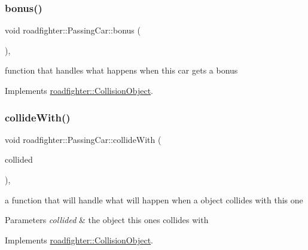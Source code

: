 \subsubsection{\texorpdfstring{bonus()}{bonus()}}
{\footnotesize\ttfamily void roadfighter\+::\+Passing\+Car\+::bonus (\begin{DoxyParamCaption}{ }\end{DoxyParamCaption})\hspace{0.3cm}{\ttfamily [override]}, {\ttfamily [virtual]}}

function that handles what happens when this car gets a bonus 

Implements \hyperlink{classroadfighter_1_1CollisionObject_a157e499c27619ceefd6179a459fafd90}{roadfighter\+::\+Collision\+Object}.

\mbox{\label{classroadfighter_1_1PassingCar_a04ee71b75c90f21efef591756855bf37}} 
\subsubsection{\texorpdfstring{collide\+With()}{collideWith()}}
{\footnotesize\ttfamily void roadfighter\+::\+Passing\+Car\+::collide\+With (\begin{DoxyParamCaption}\item[{std\+::shared\+\_\+ptr$<$ \hyperlink{classroadfighter_1_1CollisionObject}{Collision\+Object} $>$ \&}]{collided }\end{DoxyParamCaption})\hspace{0.3cm}{\ttfamily [override]}, {\ttfamily [virtual]}}

a function that will handle what will happen when a object collides with this one 
\begin{DoxyParams}{Parameters}
{\em collided} & the object this ones collides with \\
\hline
\end{DoxyParams}


Implements \hyperlink{classroadfighter_1_1CollisionObject_a7eafa2fdc4463788b816fdd9370d28d9}{roadfighter\+::\+Collision\+Object}.

\mbox{\label{classroadfighter_1_1PassingCar_a5c437fb5164d2735881a469650db048d}} 
